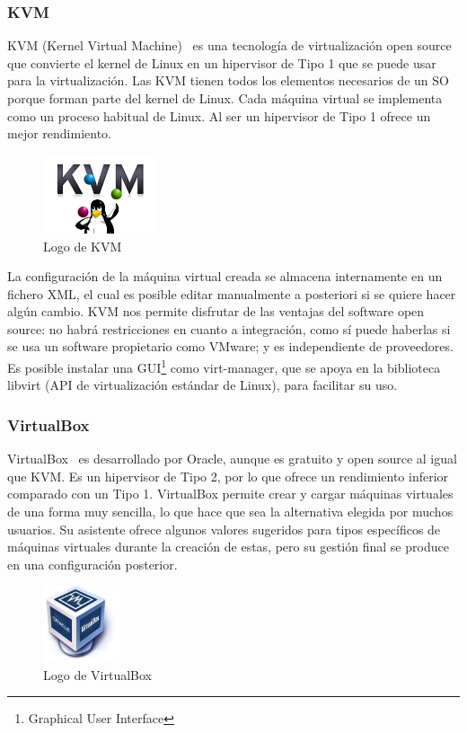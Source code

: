\subsubsection{KVM}
	KVM (Kernel Virtual Machine)~\cite{kvm} es una tecnología de virtualización open source que convierte el kernel de Linux en un hipervisor de Tipo 1 que se puede usar para la virtualización. Las KVM tienen todos los elementos necesarios de un SO porque forman parte del kernel de Linux. Cada máquina virtual se implementa como un proceso habitual de Linux. Al ser un hipervisor de Tipo 1 ofrece un mejor rendimiento. 

	\begin{figure}[h]
	\centering
	\includegraphics[width=0.3\textwidth]{../imgs/EdA/kvm.png}
	\caption{Logo de KVM}
	\label{fig:kvm}
	\end{figure}

	La configuración de la máquina virtual creada se almacena internamente en un fichero XML, el cual es posible editar manualmente a posteriori si se quiere hacer algún cambio. KVM nos permite disfrutar de las ventajas del software open source: no habrá restricciones en cuanto a integración, como sí puede haberlas si se usa un software propietario como VMware; y es independiente de proveedores. Es posible instalar una GUI\footnote{Graphical User Interface} como virt-manager, que se apoya en la biblioteca libvirt (API de virtualización estándar de Linux), para facilitar su uso.

\subsubsection{VirtualBox}
	VirtualBox~\cite{vbox} es desarrollado por Oracle, aunque es gratuito y open source al igual que KVM. Es un hipervisor de Tipo 2, por lo que ofrece un rendimiento inferior comparado con un Tipo 1. VirtualBox permite crear y cargar máquinas virtuales de una forma muy sencilla, lo que hace que sea la alternativa elegida por muchos usuarios. Su asistente ofrece algunos valores sugeridos para tipos específicos de máquinas virtuales durante la creación de estas, pero su gestión final se produce en una configuración posterior.

	\begin{figure}[h]
	\centering
	\includegraphics[width=0.2\textwidth]{../imgs/EdA/vbox.png}
	\caption{Logo de VirtualBox}
	\label{fig:vbox}
	\end{figure}

